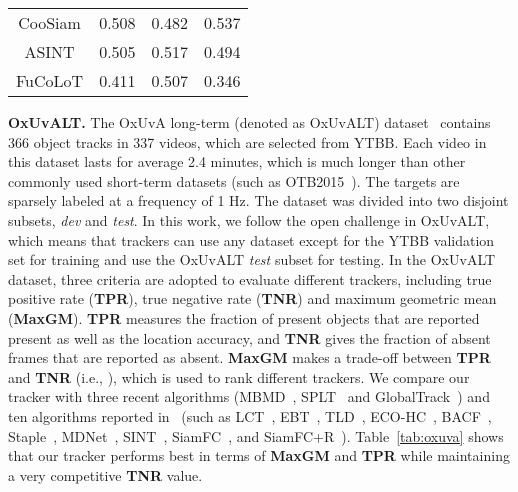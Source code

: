 \documentclass[10pt,twocolumn,letterpaper]{article}
\begin{document}
\begin{table}[h]
\begin{center}
\begin{tabular}{cccc}
CooSiam          & 0.508                                 & 0.482                                 & 0.537                                 \\
ASINT             & 0.505                                 & 0.517                                 & 0.494                                \\
FuCoLoT          & 0.411                                 & 0.507                                 & 0.346                                \\
\hline
\end{tabular}
\end{center}
\vspace{-4mm}
\end{table}


\noindent \textbf{OxUvALT.} The OxUvA long-term (denoted as OxUvALT) dataset~\cite{OxUvA}
contains 366 object tracks in 337 videos, which are selected from YTBB. Each video in this dataset
lasts for average 2.4 minutes, which is much longer than other commonly used short-term datasets
(such as OTB2015~\cite{OTB2015}).
The targets are sparsely labeled at a frequency of 1 Hz.
The dataset was divided into two disjoint subsets, \emph{dev} and \emph{test}.
In this work, we follow the open challenge in OxUvALT, which means that trackers can use any dataset
except for the YTBB validation set for training and use the OxUvALT \emph{test} subset for testing.
In the OxUvALT dataset, three criteria are adopted to evaluate different trackers, including true positive rate
(\textbf{TPR}), true negative rate (\textbf{TNR}) and maximum geometric mean (\textbf{MaxGM}).
\textbf{TPR} measures the fraction of present objects that are reported present as well
as the location accuracy, and \textbf{TNR} gives the fraction of absent frames that are reported as absent.
\textbf{MaxGM} makes a trade-off between \textbf{TPR} and \textbf{TNR} (i.e., 
), which is used to rank different trackers.
We compare our tracker with three recent algorithms (MBMD~\cite{Zhang-VOT18-MBMD},
SPLT~\cite{Yan-ICCV19-SPLT} and GlobalTrack~\cite{GlobalTrack}) and ten algorithms reported
in~\cite{OxUvA} (such as LCT~\cite{LCT}, EBT~\cite{EBT}, TLD~\cite{TLD},
ECO-HC~\cite{Danelljan-CVPR17-ECO}, BACF~\cite{BACF}, Staple~\cite{Staple},
MDNet~\cite{Nam-CVPR16-MDNet}, SINT~\cite{SINT}, SiamFC~\cite{SiameseFC},
and SiamFC+R~\cite{OxUvA}).
Table~\ref{tab:oxuva} shows that our tracker performs best in terms of \textbf{MaxGM} and \textbf{TPR}
while maintaining a very competitive \textbf{TNR} value.
\end{document}
